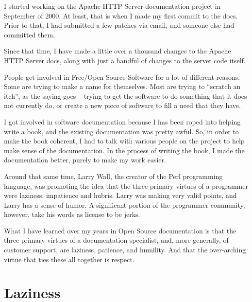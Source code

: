 

I started working on the Apache HTTP Server documentation project in September
of 2000. At least, that is when I made my first commit to the docs. Prior to
that, I had submitted a few patches via email, and someone else had committed
them.

Since that time, I have made a little over a thousand changes to the Apache HTTP
Server docs, along with just a handful of changes to the server code itself.

People get involved in Free/Open Source Software for a lot of different reasons.
Some are trying to make a name for themselves. Most are trying to ``scratch an
itch'', as the saying goes -- trying to get the software to do something that it
does not currently do, or create a new piece of software to fill a need that
they have.

I got involved in software documentation because I has been roped into helping
write a book, and the existing documentation was pretty awful. So, in order to
make the book coherent, I had to talk with various people on the project to help
make sense of the documentation. In the process of writing the book, I made the
documentation better, purely to make my work easier.

Around that same time, Larry Wall, the creator of the Perl programming language,
was promoting the idea that the three primary virtues of a programmer were
laziness, impatience and hubris. Larry was making very valid points, and Larry
has a sense of humor. A significant portion of the programmer community,
however, take his words as license to be jerks.

What I have learned over my years in Open Source documentation is that the three
primary virtues of a documentation specialist, and, more generally, of customer
support, are laziness, patience, and humility. And that the over-arching virtue
that ties these all together is respect.

\section*{Laziness}

